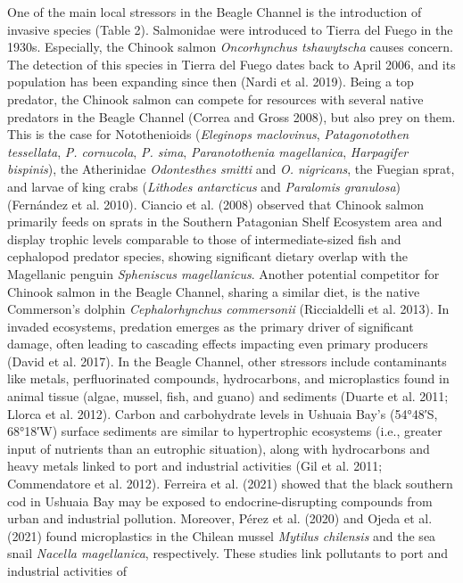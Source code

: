 \documentclass[
]{article}
\begin{document}
One of the main local stressors in the Beagle Channel is the
introduction of invasive species (Table 2). Salmonidae were introduced
to Tierra del Fuego in the 1930s. Especially, the Chinook salmon
\emph{Oncorhynchus tshawytscha} causes concern. The detection of this
species in Tierra del Fuego dates back to April 2006, and its population
has been expanding since then (Nardi et al. 2019). Being a top predator,
the Chinook salmon can compete for resources with several native
predators in the Beagle Channel (Correa and Gross 2008), but also prey
on them. This is the case for Notothenioids (\emph{Eleginops
maclovinus}, \emph{Patagonotothen tessellata}, \emph{P. cornucola},
\emph{P. sima}, \emph{Paranotothenia magellanica}, \emph{Harpagifer
bispinis}), the Atherinidae \emph{Odontesthes smitti} and \emph{O.
nigricans}, the Fuegian sprat, and larvae of king crabs (\emph{Lithodes
antarcticus} and \emph{Paralomis granulosa}) (Fernández et al. 2010).
Ciancio et al. (2008) observed that Chinook salmon primarily feeds on
sprats in the Southern Patagonian Shelf Ecosystem area and display
trophic levels comparable to those of intermediate-sized fish and
cephalopod predator species, showing significant dietary overlap with
the Magellanic penguin \emph{Spheniscus magellanicus}. Another potential
competitor for Chinook salmon in the Beagle Channel, sharing a similar
diet, is the native Commerson's dolphin \emph{Cephalorhynchus
commersonii} (Riccialdelli et al. 2013). In invaded ecosystems,
predation emerges as the primary driver of significant damage, often
leading to cascading effects impacting even primary producers (David et
al. 2017). In the Beagle Channel, other stressors include contaminants
like metals, perfluorinated compounds, hydrocarbons, and microplastics
found in animal tissue (algae, mussel, fish, and guano) and sediments
(Duarte et al. 2011; Llorca et al. 2012). Carbon and carbohydrate levels
in Ushuaia Bay's (54°48′S, 68°18′W) surface sediments are similar to
hypertrophic ecosystems (i.e., greater input of nutrients than an
eutrophic situation), along with hydrocarbons and heavy metals linked to
port and industrial activities (Gil et al. 2011; Commendatore et al.
2012). Ferreira et al. (2021) showed that the black southern cod in
Ushuaia Bay may be exposed to endocrine-disrupting compounds from urban
and industrial pollution. Moreover, Pérez et al. (2020) and Ojeda et al.
(2021) found microplastics in the Chilean mussel \emph{Mytilus
chilensis} and the sea snail \emph{Nacella magellanica}, respectively.
These studies link pollutants to port and industrial activities of
\end{document}
